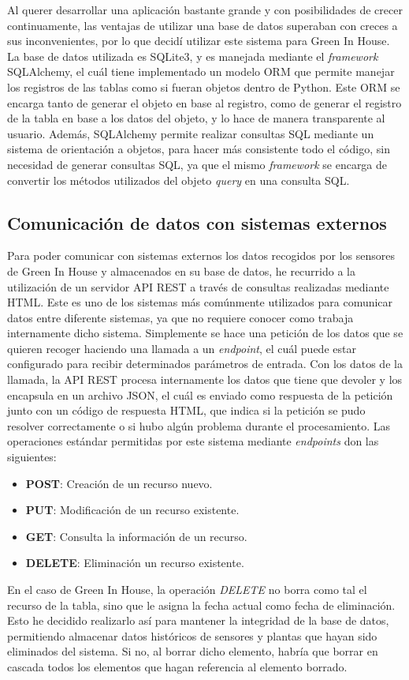     Al querer desarrollar una aplicación bastante grande y con posibilidades de crecer continuamente, las ventajas de utilizar una base de datos superaban con creces a sus inconvenientes, por lo que decidí utilizar este sistema para Green In House. La base de datos utilizada es SQLite3, y es manejada mediante el \textit{framework} SQLAlchemy, el cuál tiene implementado un modelo ORM que permite manejar los registros de las tablas como si fueran objetos dentro de Python. Este ORM se encarga tanto de generar el objeto en base al registro, como de generar el registro de la tabla en base a los datos del objeto, y lo hace de manera transparente al usuario. Además, SQLAlchemy permite realizar consultas SQL mediante un sistema de orientación a objetos, para hacer más consistente todo el código, sin necesidad de generar consultas SQL, ya que el mismo \textit{framework} se encarga de convertir los métodos utilizados del objeto \textit{query} en una consulta SQL.  

    \subsection{Comunicación de datos con sistemas externos}
    Para poder comunicar con sistemas externos los datos recogidos por los sensores de Green In House y almacenados en su base de datos, he recurrido a la utilización de un servidor API REST a través de consultas realizadas mediante HTML. 
    Este es uno de los sistemas más comúnmente utilizados para comunicar datos entre diferente sistemas, ya que no requiere conocer como trabaja internamente dicho sistema. Simplemente se hace una petición de los datos que se quieren recoger haciendo una llamada a un \textit{endpoint}, el cuál puede estar configurado para recibir determinados parámetros de entrada. Con los datos de la llamada, la API REST procesa internamente los datos que tiene que devoler y los encapsula en un archivo JSON, el cuál es enviado como respuesta de la petición junto con un código de respuesta HTML, que indica si la petición se pudo resolver correctamente o si hubo algún problema durante el procesamiento. 
    Las operaciones estándar permitidas por este sistema mediante \textit{endpoints} don las siguientes:
    \begin{itemize}
        \item \textbf{POST}: Creación de un recurso nuevo.
        \item \textbf{PUT}: Modificación de un recurso existente.
        \item \textbf{GET}: Consulta la información de un recurso.
        \item \textbf{DELETE}: Eliminación un recurso existente.
    \end{itemize}
    En el caso de Green In House, la operación \textit{DELETE} no borra como tal el recurso de la tabla, sino que le asigna la fecha actual como fecha de eliminación. Esto he decidido realizarlo así para mantener la integridad de la base de datos, permitiendo almacenar datos históricos de sensores y plantas que hayan sido eliminados del sistema. Si no, al borrar dicho elemento, habría que borrar en cascada todos los elementos que hagan referencia al elemento borrado.

